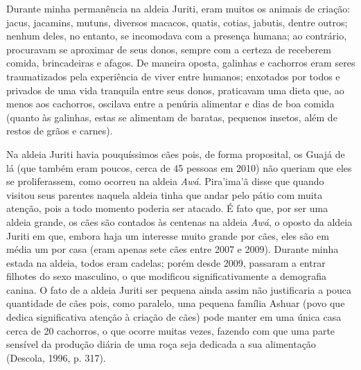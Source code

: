 Durante minha permanência na aldeia Juriti, eram muitos os animais de
criação: jacus, jacamins, mutuns, diversos macacos, quatis, cotias,
jabutis, dentre outros; nenhum deles, no entanto, se incomodava com a
presença humana; ao contrário, procuravam se aproximar de seus donos,
sempre com a certeza de receberem comida, brincadeiras e afagos. De
maneira oposta, galinhas e cachorros eram seres traumatizados pela
experiência de viver entre humanos; enxotados por todos e privados de
uma vida tranquila entre seus donos, praticavam uma dieta que, ao menos
aos cachorros, oscilava entre a penúria alimentar e dias de boa comida
(quanto às galinhas, estas se alimentam de baratas, pequenos insetos,
além de restos de grãos e carnes).

Na aldeia Juriti havia pouquíssimos cães pois, de forma proposital, os
Guajá de lá (que também eram poucos, cerca de 45 pessoas em 2010) não
queriam que eles se proliferassem, como ocorreu na aldeia \emph{Awá}.
Pira'ima'ã disse que quando visitou seus parentes naquela aldeia tinha
que andar pelo pátio com muita atenção, pois a todo momento poderia ser
atacado. É fato que, por ser uma aldeia grande, os cães são contados às
centenas na aldeia \emph{Awá}, o oposto da aldeia Juriti em que, embora
haja um interesse muito grande por cães, eles são em média um por casa
(eram apenas sete cães entre 2007 e 2009). Durante minha estada na
aldeia, todos eram cadelas; porém desde 2009, passaram a entrar filhotes
do sexo masculino, o que modificou significativamente a demografia
canina. O fato de a aldeia Juriti ser pequena ainda assim não
justificaria a pouca quantidade de cães pois, como paralelo, uma pequena
família Ashuar (povo que dedica significativa atenção à criação de cães)
pode manter em uma única casa cerca de 20 cachorros, o que ocorre muitas
vezes, fazendo com que uma parte sensível da produção diária de uma roça
seja dedicada a sua alimentação (Descola, 1996, p. 317).

